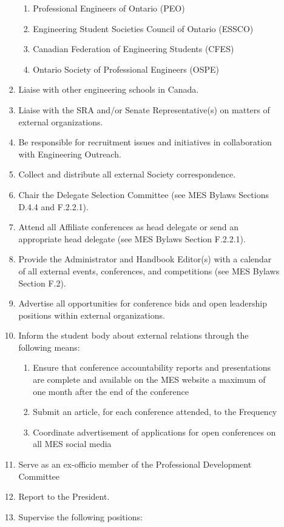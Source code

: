 \begin{enumerate}
\begin{enumerate}
\begin{enumerate}
    \begin{enumerate}
     \item
      Professional Engineers of Ontario (PEO)
     \item
      Engineering Student Societies Council of Ontario (ESSCO)
     \item
      Canadian Federation of Engineering Students (CFES)
     \item
      Ontario Society of Professional Engineers (OSPE)
    \end{enumerate}
   \item
    Liaise with other engineering schools in Canada.
   \item
    Liaise with the SRA and/or Senate Representative(s) on matters of
    external organizations.
   \item
    Be responsible for recruitment issues and initiatives in collaboration
    with Engineering Outreach.
   \item
    Collect and distribute all external Society correspondence.
   \item
    Chair the Delegate Selection Committee (see MES Bylaws Sections D.4.4
    and F.2.2.1).
   \item
    Attend all Affiliate conferences as head delegate or send an
    appropriate head delegate (see MES Bylaws Section F.2.2.1).
   \item
    Provide the Administrator and Handbook Editor(s) with a calendar of
    all external events, conferences, and competitions (see MES Bylaws
    Section F.2).
   \item
    Advertise all opportunities for conference bids and open leadership
    positions within external organizations.
   \item
    Inform the student body about external relations through the following
    means:
  
    \begin{enumerate}
     \item
      Ensure that conference accountability reports and presentations are
      complete and available on the MES website a maximum of one month
      after the end of the conference
     \item
      Submit an article, for each conference attended, to the Frequency
     \item
      Coordinate advertisement of applications for open conferences on all
      MES social media
    \end{enumerate}
   \item
    Serve as an ex-officio member of the Professional Development
    Committee
   \item
    Report to the President.
   \item
    Supervise the following positions:
  

\end{enumerate}
\end{enumerate}
\end{enumerate}
